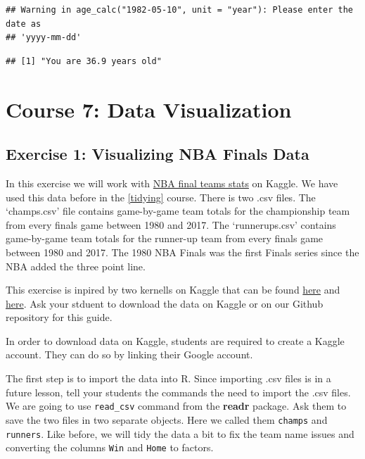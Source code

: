 \documentclass[]{book}
\begin{document}
\begin{verbatim}
## Warning in age_calc("1982-05-10", unit = "year"): Please enter the date as
## 'yyyy-mm-dd'
\end{verbatim}

\begin{verbatim}
## [1] "You are 36.9 years old"
\end{verbatim}

\hypertarget{visualization}{%
\chapter*{Course 7: Data Visualization}\label{visualization}}

\hypertarget{exercise-1-visualizing-nba-finals-data}{%
\section*{Exercise 1: Visualizing NBA Finals Data}\label{exercise-1-visualizing-nba-finals-data}}

In this exercise we will work with \href{https://www.kaggle.com/daverosenman/nba-finals-team-stats}{NBA final teams stats} on Kaggle. We have used this data before in the \ref{tidying} course. There is two .csv files. The `champs.csv' file contains game-by-game team totals for the championship team from every finals game between 1980 and 2017. The `runnerups.csv' contains game-by-game team totals for the runner-up team from every finals game between 1980 and 2017. The 1980 NBA Finals was the first Finals series since the NBA added the three point line.

This exercise is inpired by two kernells on Kaggle that can be found \href{https://www.kaggle.com/carterallen/nba-championship-data}{here} and \href{https://www.kaggle.com/daverosenman/nba-finals-three-point-stats-1980-2017}{here}. Ask your stduent to download the data on Kaggle or on our Github repository for this guide.

In order to download data on Kaggle, students are required to create a Kaggle account. They can do so by linking their Google account.

The first step is to import the data into R. Since importing .csv files is in a future lesson, tell your students the commands the need to import the .csv files. We are going to use \texttt{read\_csv} command from the \textbf{readr} package. Ask them to save the two files in two separate objects. Here we called them \texttt{champs} and \texttt{runners}. Like before, we will tidy the data a bit to fix the team name issues and converting the columns \texttt{Win} and \texttt{Home} to factors.
\end{document}
